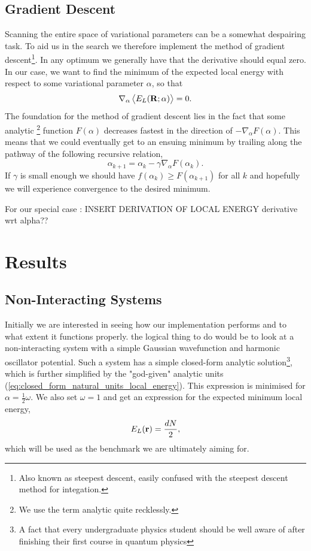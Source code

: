 \documentclass[
    a4paper, aps, twocolumn, floatfix, superscriptaddress, nofootinbib]{revtex4-1}
\newcommand{\1}{\mathds{1}}
\begin{document}
        \subsection{Gradient Descent}

        Scanning the entire space of variational parameters can be a somewhat
        despairing task. To aid us in the search we therefore implement the
        method of gradient descent\footnote{Also known as steepest descent,
        easily confused with the steepest descent method for integation.}. In
        any optimum we generally have that the derivative should equal zero. In
        our case, we want to find the minimum of the expected local energy with
        respect to some variational parameter $\alpha$, so that
        \begin{equation}
            \nabla_\alpha \expval{E_L(\mathbf{R}; \alpha)} = 0.
        \end{equation}
        The foundation for  the method of gradient descent lies in the fact that
        some analytic \footnote{We use the term analytic quite recklessly.}
        function $F(\alpha)$ decreases fastest in the direction of
        $-\nabla_\alpha F(\alpha)$. This means that we could eventually get to
        an ensuing minimum by trailing along the pathway of the following
        recursive relation,
        \begin{equation}
            \alpha_{k+1} = \alpha_k - \gamma \nabla_{\alpha} F(\alpha_k).
        \end{equation}
        If $\gamma$ is small enough we should have $f(\alpha_k) \geq
        F(\alpha_{k+1})$ for all $k$ and hopefully we will experience
        convergence to the desired minimum.

        For our special case : INSERT DERIVATION OF LOCAL ENERGY derivative wrt alpha??

\section{Results}

    \subsection{Non-Interacting Systems}
    Initially we are interested in seeing how our implementation performs and to what extent it functions properly.
    the logical thing to do would be to look at a non-interacting system with a simple Gaussian wavefunction and
    harmonic oscillator potential. Such a system has a simple closed-form analytic solution\footnote{A fact that every
    undergraduate physics student should be well aware of after finishing their first course in quantum physics},
    which is further simplified by the "god-given" analytic
    units (\autoref{eq:closed_form_natural_units_local_energy}). This expression is minimised for
    $\alpha = \frac{1}{2}\omega$. We also set $\omega = 1$ and get an expression for the
    expected minimum local energy,
    \begin{equation}
        E_L(\vb{r}) = \frac{dN}{2},
    \end{equation}
    which will be used as the benchmark we are ultimately aiming for.
\end{document}
